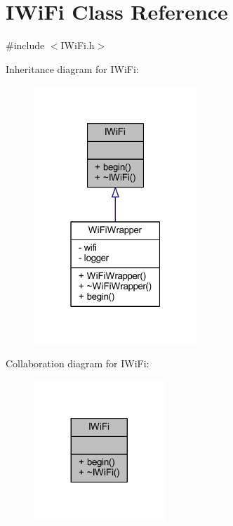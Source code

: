 \hypertarget{class_i_wi_fi}{}\section{I\+Wi\+Fi Class Reference}
\label{class_i_wi_fi}


{\ttfamily \#include $<$I\+Wi\+Fi.\+h$>$}



Inheritance diagram for I\+Wi\+Fi\+:
\nopagebreak
\begin{figure}[H]
\begin{center}
\leavevmode
\includegraphics[width=175pt]{class_i_wi_fi__inherit__graph}
\end{center}
\end{figure}


Collaboration diagram for I\+Wi\+Fi\+:
\nopagebreak
\begin{figure}[H]
\begin{center}
\leavevmode
\includegraphics[width=140pt]{class_i_wi_fi__coll__graph}
\end{center}
\end{figure}
